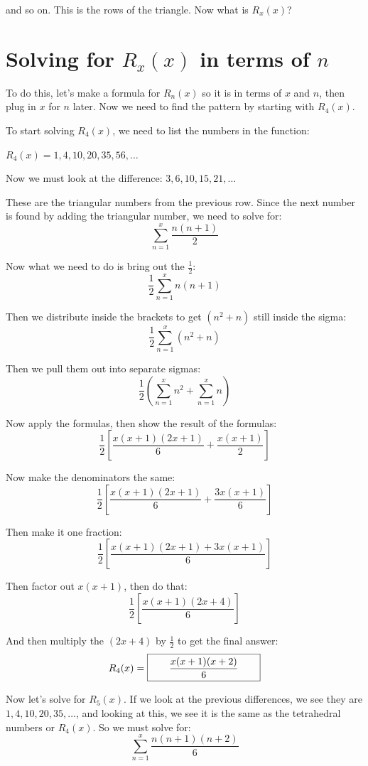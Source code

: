 \documentclass{article}
\begin{document}
and so on. This is the rows of the triangle. Now what is $R_x(x)$?

\section{Solving for $R_x(x)$ in terms of $n$}

To do this, let's make a formula for $R_n(x)$ so it is in terms of 
$x$ and $n$, then plug in $x$ for $n$ later. Now we need to find the pattern by starting with $R_4(x)$.

To start solving $R_4(x)$, we need to list the numbers in the function:

$R_4(x) = 1, 4, 10, 20, 35, 56, \dots$

Now we must look at the difference:
$3, 6, 10, 15, 21, \dots$

These are the triangular numbers from the previous row. Since the next number is found by adding the triangular number, we need to solve for:
$$\sum_{n=1}^{x} \frac{n(n + 1)}{2}$$

Now what we need to do is bring out the $\frac{1}{2}$:
$$\frac{1}{2} \sum_{n=1}^{x} n(n + 1)$$

Then we distribute inside the brackets to get $(n^2 + n)$ still inside the sigma:
$$\frac{1}{2} \sum_{n=1}^{x} (n^2 + n)$$

Then we pull them out into separate sigmas:
$$\frac{1}{2} \left( \sum_{n=1}^{x} n^2 + \sum_{n=1}^{x} n \right)$$

Now apply the formulas, then show the result of the formulas:
$$\frac{1}{2} \left[ \frac{x(x+1)(2x+1)}{6} + \frac{x(x+1)}{2} \right]$$

Now make the denominators the same:
$$\frac{1}{2} \left[ \frac{x(x+1)(2x+1)}{6} + \frac{3x(x+1)}{6} \right]$$

Then make it one fraction:
$$\frac{1}{2} \left[ \frac{x(x+1)(2x+1) + 3x(x+1)}{6} \right]$$

Then factor out $x(x+1)$, then do that:
$$\frac{1}{2} \left[ \frac{x(x+1)(2x+4)}{6} \right]$$

And then multiply the $(2x+4)$ by $\frac{1}{2}$ to get the final answer:
$$R_4(x) = \framebox[4cm]{$\displaystyle\frac{x(x+1)(x+2)}{6}$}$$

Now let's solve for $R_5(x)$. If we look at the previous differences, we 
see they are $1, 4, 10, 20, 35, \dots$, and looking at this, we see it 
is the same as the tetrahedral numbers or $R_4(x)$. So we must solve for:
$$\sum_{n=1}^{x} \frac{n(n+1)(n+2)}{6}$$
\end{document}
